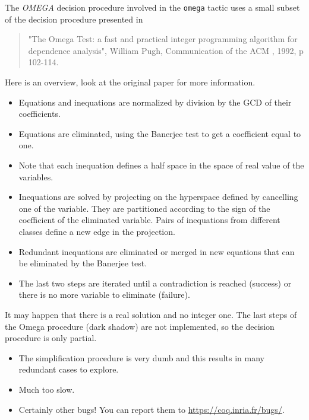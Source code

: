 
The {\it OMEGA} decision procedure involved in the {\tt omega} tactic uses
a small subset of the decision procedure presented in

\begin{quote}
  "The Omega Test: a fast and practical integer programming
algorithm for dependence analysis", William Pugh, Communication of the
ACM , 1992, p 102-114.
\end{quote}

Here is an overview, look at the original paper for more information.

\begin{itemize}

\item Equations and inequations are normalized by division by the GCD of their
     coefficients.
\item Equations are eliminated, using the Banerjee test to get a coefficient 
     equal to one.
\item Note that each inequation defines a half space in the space of real value
     of the variables.
   \item Inequations are solved by projecting on the hyperspace
     defined by cancelling one of the variable.  They are partitioned
     according to the sign of the coefficient of the eliminated
     variable. Pairs of inequations from different classes define a
     new edge in the projection.
   \item Redundant inequations are eliminated or merged in new
     equations that can be eliminated by the Banerjee test.
\item The last two steps are iterated until a contradiction is reached
     (success) or there is no more variable to eliminate (failure).

\end{itemize}

It may happen that there is a real solution and no integer one. The last
steps of the Omega procedure (dark shadow) are not implemented, so the 
decision procedure is only partial.


\begin{itemize}
\item The simplification procedure is very dumb and this results in
  many redundant cases to explore.

\item Much too slow.

\item Certainly other bugs! You can report them to \url{https://coq.inria.fr/bugs/}.

\end{itemize}

